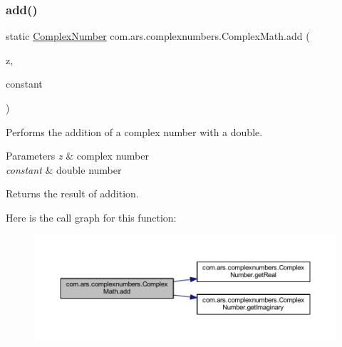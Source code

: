 \subsubsection{\texorpdfstring{add()}{add()}\hspace{0.1cm}{\footnotesize\ttfamily [2/2]}}
{\footnotesize\ttfamily static \hyperlink{classcom_1_1ars_1_1complexnumbers_1_1_complex_number}{Complex\+Number} com.\+ars.\+complexnumbers.\+Complex\+Math.\+add (\begin{DoxyParamCaption}\item[{\hyperlink{classcom_1_1ars_1_1complexnumbers_1_1_complex_number}{Complex\+Number}}]{z,  }\item[{double}]{constant }\end{DoxyParamCaption})\hspace{0.3cm}{\ttfamily [static]}}

Performs the addition of a complex number with a double. 
\begin{DoxyParams}{Parameters}
{\em z} & complex number \\
\hline
{\em constant} & double number \\
\hline
\end{DoxyParams}
\begin{DoxyReturn}{Returns}
the result of addition. 
\end{DoxyReturn}
Here is the call graph for this function\+:\nopagebreak
\begin{figure}[H]
\begin{center}
\leavevmode
\includegraphics[width=350pt]{classcom_1_1ars_1_1complexnumbers_1_1_complex_math_ac40f506def2684820fa0c85c6672f5a3_cgraph}
\end{center}
\end{figure}
\hypertarget{classcom_1_1ars_1_1complexnumbers_1_1_complex_math_aed293397f1ec0c1dda82589b436388c3}{}\label{classcom_1_1ars_1_1complexnumbers_1_1_complex_math_aed293397f1ec0c1dda82589b436388c3} 
